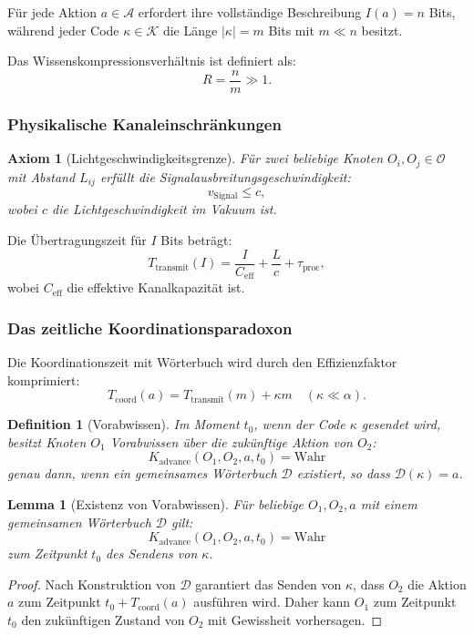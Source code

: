 \documentclass[11pt,a4paper]{article}
\newtheorem{lemma}{Lemma}
\newtheorem{axiom}{Axiom}
\newtheorem{definition}{Definition}
\begin{document}
	Für jede Aktion $a \in \mathcal{A}$ erfordert ihre vollständige Beschreibung $I(a) = n$ Bits, während jeder Code $\kappa \in \mathcal{K}$ die Länge $|\kappa| = m$ Bits mit $m \ll n$ besitzt.
	
	Das Wissenskompressionsverhältnis ist definiert als:
	\[
	R = \frac{n}{m} \gg 1.
	\]
	
	\subsubsection{Physikalische Kanaleinschränkungen}
	
	\begin{axiom}[Lichtgeschwindigkeitsgrenze]
		Für zwei beliebige Knoten $O_i, O_j \in \mathcal{O}$ mit Abstand $L_{ij}$ erfüllt die Signalausbreitungsgeschwindigkeit:
		\[
		v_{\text{Signal}} \leq c,
		\]
		wobei $c$ die Lichtgeschwindigkeit im Vakuum ist.
	\end{axiom}
	
	Die Übertragungszeit für $I$ Bits beträgt:
	\[
	T_{\text{transmit}}(I) = \frac{I}{C_{\text{eff}}} + \frac{L}{c} + \tau_{\text{proc}},
	\]
	wobei $C_{\text{eff}}$ die effektive Kanalkapazität ist.
	
	\subsubsection{Das zeitliche Koordinationsparadoxon}
	
	Die Koordinationszeit mit Wörterbuch wird durch den Effizienzfaktor komprimiert:
	\[
	T_{\text{coord}}(a) = T_{\text{transmit}}(m) + \kappa m \quad (\kappa \ll \alpha).
	\]
	
	\begin{definition}[Vorabwissen]
		Im Moment $t_0$, wenn der Code $\kappa$ gesendet wird, besitzt Knoten $O_1$ Vorabwissen über die zukünftige Aktion von $O_2$:
		\[
		K_{\text{advance}}(O_1, O_2, a, t_0) = \text{Wahr}
		\]
		genau dann, wenn ein gemeinsames Wörterbuch $\mathcal{D}$ existiert, so dass $\mathcal{D}(\kappa) = a$.
	\end{definition}
	
	\begin{lemma}[Existenz von Vorabwissen]
		\label{lem:advance-knowledge}
		Für beliebige $O_1, O_2, a$ mit einem gemeinsamen Wörterbuch $\mathcal{D}$ gilt:
		\[
		K_{\text{advance}}(O_1, O_2, a, t_0) = \text{Wahr}
		\]
		zum Zeitpunkt $t_0$ des Sendens von $\kappa$.
	\end{lemma}
	
	\begin{proof}
		Nach Konstruktion von $\mathcal{D}$ garantiert das Senden von $\kappa$, dass $O_2$ die Aktion $a$ zum Zeitpunkt $t_0 + T_{\text{coord}}(a)$ ausführen wird. Daher kann $O_1$ zum Zeitpunkt $t_0$ den zukünftigen Zustand von $O_2$ mit Gewissheit vorhersagen.
	\end{proof}
	
\end{document}
